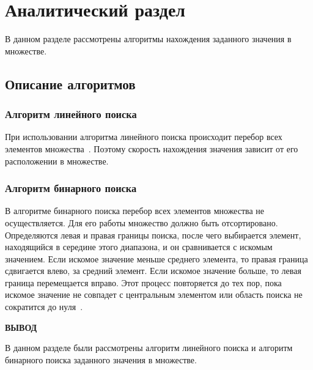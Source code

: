 \chapter{Аналитический раздел}

В данном разделе рассмотрены алгоритмы нахождения заданного значения в множестве.

\section{Описание алгоритмов}

\subsection{Алгоритм линейного поиска}
При использовании алгоритма линейного поиска происходит перебор всех элементов множества~\cite{linear_search}. Поэтому скорость нахождения значения зависит от его расположении в множестве.

\subsection{Алгоритм бинарного поиска}
В алгоритме бинарного поиска перебор всех элементов множества не осуществляется. Для его работы множество должно быть отсортировано. Определяются левая и правая границы поиска, после чего выбирается элемент, находящийся в середине этого диапазона, и он сравнивается с искомым значением. Если искомое значение меньше среднего элемента, то правая граница сдвигается влево, за средний элемент. Если искомое значение больше, то левая граница перемещается вправо. Этот процесс повторяется до тех пор, пока искомое значение не совпадет с центральным элементом или область поиска не сократится до нуля~\cite{binary_search}.

\clearpage
\textbf{ВЫВОД}

В данном разделе были рассмотрены алгоритм линейного поиска и алгоритм бинарного поиска заданного значения в множестве.